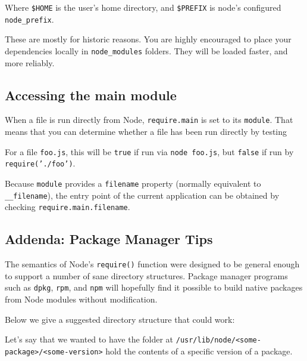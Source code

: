 Where \texttt{\$HOME} is the user's home directory, and
\texttt{\$PREFIX} is node's configured \texttt{node\_prefix}.

These are mostly for historic reasons. You are highly encouraged to
place your dependencies locally in \texttt{node\_modules} folders. They
will be loaded faster, and more reliably.

\subsection{Accessing the main module}\label{accessing-the-main-module}

When a file is run directly from Node, \texttt{require.main} is set to
its \texttt{module}. That means that you can determine whether a file
has been run directly by testing

\begin{Shaded}
\begin{Highlighting}[]
 
\end{Highlighting}
\end{Shaded}

For a file \texttt{foo.js}, this will be \texttt{true} if run via
\texttt{node foo.js}, but \texttt{false} if run by
\texttt{require('./foo')}.

Because \texttt{module} provides a \texttt{filename} property (normally
equivalent to \texttt{\_\_filename}), the entry point of the current
application can be obtained by checking \texttt{require.main.filename}.

\subsection{Addenda: Package Manager
Tips}\label{addenda-package-manager-tips}

The semantics of Node's \texttt{require()} function were designed to be
general enough to support a number of sane directory structures. Package
manager programs such as \texttt{dpkg}, \texttt{rpm}, and \texttt{npm}
will hopefully find it possible to build native packages from Node
modules without modification.

Below we give a suggested directory structure that could work:

Let's say that we wanted to have the folder at
\texttt{/usr/lib/node/\textless{}some-package\textgreater{}/\textless{}some-version\textgreater{}}
hold the contents of a specific version of a package.

